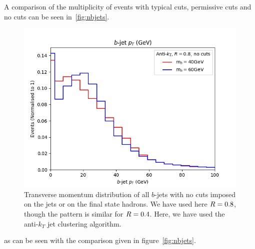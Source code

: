 A comparison of the  multiplicity of events with
typical cuts, permissive cuts and no cuts can be seen in~\ref{fig:nbjets}.
\begin{figure}[htb!]
	\centering
	\includegraphics[scale=0.6]{plots/bjetpt_AK8_nocuts.png}
    \caption{Transverse momentum distribution of all $b$-jets with no cuts imposed on the jets or on the final state hadrons. We have used here $R{}=0.8$, though the pattern is similar for $R{}=0.4$. Here, we have used the anti-$k_T$ jet clustering algorithm.}
\label{fig:bjetpt}
\end{figure}
as can be seen with the comparison given in figure~\ref{fig:nbjets}.
